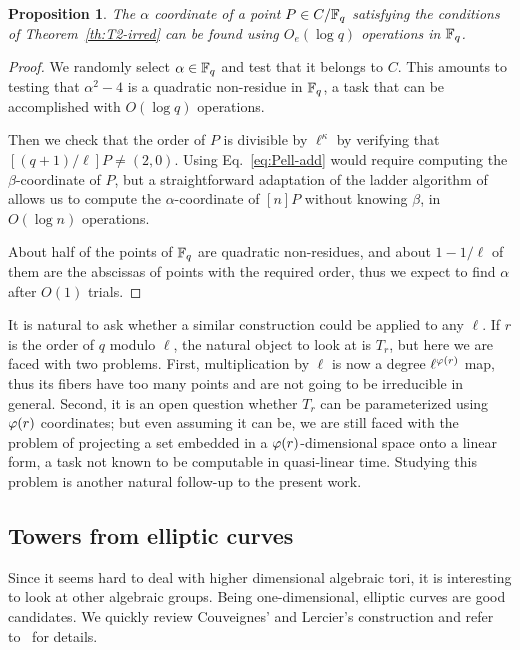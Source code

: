 \documentclass{sig-alternate}
\newtheorem{proposition}[definition]{Proposition}
\begin{document}
\begin{proposition}
  The $\alpha$ coordinate of a point $P\in C/\mathbb{F}_q$ satisfying the
  conditions of Theorem~\ref{th:T2-irred} can be found using $O_e(\log
  q)$ operations in $\mathbb{F}_q$.
\end{proposition}
\begin{proof}
  We randomly select $\alpha\in\mathbb{F}_q$ and test that it belongs to
  $C$. This amounts to testing that $\alpha^2-4$ is a quadratic
  non-residue in $\mathbb{F}_q$, a task that can be accomplished with $O(\log
  q)$ operations.

  Then we check that the order of $P$ is divisible by $\ell^\kappa$ by
  verifying that $[(q+1)/\ell]P\ne (2,0)$. Using
  Eq.~\eqref{eq:Pell-add} would require computing the
  $\beta$-coordinate of $P$, but a straightforward adaptation of the
  ladder algorithm of~\cite{montgomery} allows us to compute the
  $\alpha$-coordinate of $[n]P$ without knowing $\beta$, in $O(\log
  n)$ operations.

  About half of the points of $\mathbb{F}_q$ are quadratic non-residues, and
  about $1-1/\ell$ of them are the abscissas of points with the
  required order, thus we expect to find $\alpha$ after $O(1)$ trials.
\end{proof}

It is natural to ask whether a similar construction could be applied
to any $\ell$. If $r$ is the order of $q$ modulo $\ell$, the natural
object to look at is $T_r$, but here we are faced with two
problems. First, multiplication by $\ell$ is now a degree
$\ell^{\varphi(r)}$ map, thus its fibers have too many points and are
not going to be irreducible in general. Second, it is an open question
whether $T_r$ can be parameterized using $\varphi(r)$ coordinates; but
even assuming it can be, we are still faced with the problem of
projecting a set embedded in a $\varphi(r)$-dimensional space onto a
linear form, a task not known to be computable in quasi-linear
time. Studying this problem is another natural follow-up to the
present work.


\subsection{Towers from elliptic curves}

Since it seems hard to deal with higher dimensional algebraic tori, it
is interesting to look at other algebraic groups. Being
one-dimensional, elliptic curves are good candidates. We quickly
review Couveignes' and Lercier's construction and refer
to~\cite{couveignes+lercier11} for details.
\end{document}
